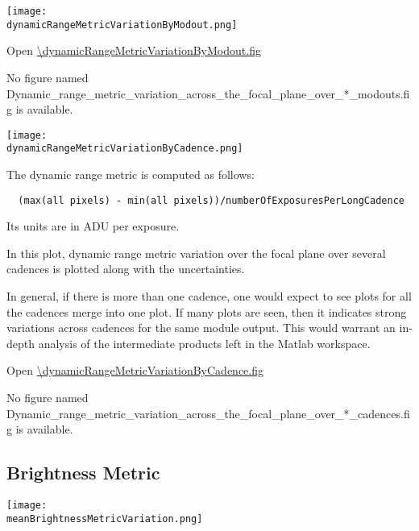 \ifdefined \dynamicRangeMetricVariationByModout

\begin{center}
  \texttt{[image: \\dynamicRangeMetricVariationByModout.png]}
\end{center}

\dynamicRangeMetricVariationByModoutCaption

Open \url{\dynamicRangeMetricVariationByModout.fig}

\else
No figure named
Dynamic\_range\_metric\_variation\_across\_the\_focal\_plane\_over\_*\_modouts.fig is
available.
\fi
\clearpage

\ifdefined \dynamicRangeMetricVariationByCadence

\begin{center}
  \texttt{[image: \\dynamicRangeMetricVariationByCadence.png]}
\end{center}

The dynamic range metric is computed as follows:

\begin{verbatim}
  (max(all pixels) - min(all pixels))/numberOfExposuresPerLongCadence
\end{verbatim}

Its units are in ADU per exposure.

In this plot, dynamic range metric variation over the focal plane over
several cadences is plotted along with the uncertainties.

In general, if there is more than one cadence, one would expect to see
plots for all the cadences merge into one plot. If many plots are
seen, then it indicates strong variations across cadences for the same
module output. This would warrant an in-depth analysis of the
intermediate products left in the Matlab workspace.

Open \url{\dynamicRangeMetricVariationByCadence.fig}

\else
No figure named
Dynamic\_range\_metric\_variation\_across\_the\_focal\_plane\_over\_*\_cadences.fig is
available.
\fi
\clearpage

\subsection{Brightness Metric}

\ifdefined \meanBrightnessMetricVariation

\begin{center}
  \texttt{[image: \\meanBrightnessMetricVariation.png]}
\end{center}

